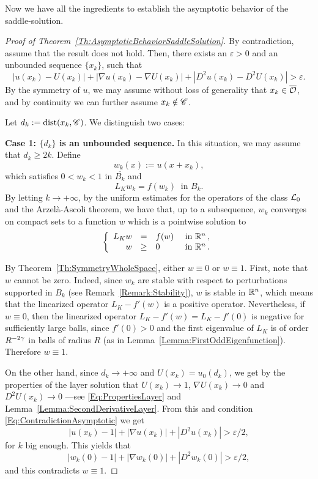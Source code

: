 Now we have all the ingredients to establish the asymptotic behavior of the saddle-solution.



\begin{proof}[Proof of Theorem~\ref{Th:AsymptoticBehaviorSaddleSolution}]
By contradiction, assume that the result does not hold. Then, there exists an $\varepsilon>0$ and an unbounded sequence $\{x_k\}$, such that
\begin{equation}
\label{Eq:ContradictionAsymptotic}
|u(x_k)-U(x_k)|+|\nabla u(x_k)-\nabla U(x_k)|+|D^2u(x_k)-D^2U(x_k)| > \varepsilon.
\end{equation}
By the symmetry of $u$, we may assume without loss of generality that $x_k \in \overline{\mathcal{O}}$, and by continuity we can further assume $ x_k \notin \mathscr{C}$. 

Let $d_k:=\operatorname{dist}(x_k,\mathscr{C})$. We distinguish two cases:

\textbf{Case 1: $\{d_k\}$ is an unbounded sequence.} In this situation, we may assume that $d_k \geq 2k$. Define
$$
w_k(x) := u(x+x_k), 
$$
which satisfies $0<w_k<1$ in $\overline{B_k}$ and
$$
L_K w_k = f(w_k) \ \textrm{ in } B_k.
$$
By letting $k\to +\infty$, by the uniform estimates for the operators of the class $\mathcal{L}_0$ and the Arzelà-Ascoli theorem, we have that, up to a subsequence, $w_k$ converges on compact sets to a function $w$ which is a pointwise solution to
$$
\left\{\begin{array}{rcll}
L_K  w &=& f(w) & \textrm{ in }\mathbb{R}^n\,,\\
w &\geq& 0 & \textrm{ in } \mathbb{R}^n\,.
\end{array} \right.
$$

By Theorem~\ref{Th:SymmetryWholeSpace}, either $w\equiv 0$ or $w\equiv 1$. First, note that $w$ cannot be zero. Indeed, since $w_k$ are stable with respect to perturbations supported in $B_k$ (see Remark~\ref{Remark:Stability}), $w$ is stable in $\mathbb{R}^n$, which means that the linearized operator $L_K-f'(w)$ is a positive operator. Nevertheless, if $w\equiv 0$, then the linearized operator $L_K-f'(w) = L_K-f'(0)$ is negative for sufficiently large balls, since $f'(0)>0$ and the first eigenvalue of $L_K$ is of order $R^{-2\gamma}$ in balls of radius $R$ (as in Lemma~\ref{Lemma:FirstOddEigenfunction}). Therefore $w\equiv 1$. 

On the other hand, since $d_k\rightarrow +\infty$ and $U(x_k) =  u_0(d_k)$, we get by the properties of the layer solution that $U(x_k) \rightarrow 1$, $\nabla U(x_k) \rightarrow 0$ and $D^2U(x_k) \rightarrow 0$ ---see \eqref{Eq:PropertiesLayer} and Lemma~\ref{Lemma:SecondDerivativeLayer}. From this and condition \eqref{Eq:ContradictionAsymptotic} we get
$$
|u(x_k)-1|+|\nabla u(x_k)|+|D^2u(x_k)| > \varepsilon/2,
$$
for $k$ big enough. This yields that 
$$
|w_k(0)-1|+|\nabla w_k(0)|+|D^2w_k(0)| > \varepsilon/2,
$$
and this contradicts $w \equiv 1$. 


\end{proof}
